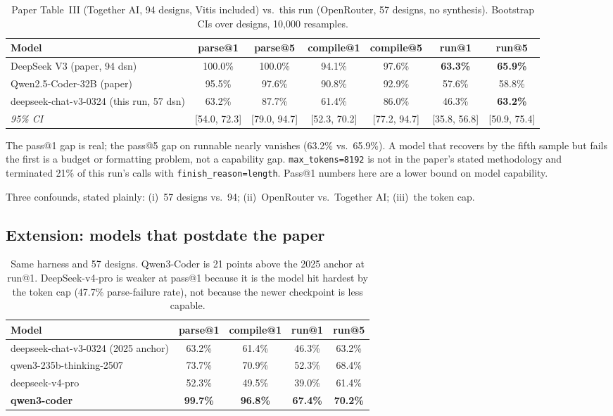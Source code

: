 \documentclass[11pt]{article}
\newcommand{\code}[1]{\texttt{#1}}
\begin{document}
\begin{table}[h]
\centering
\small
\begin{tabular}{@{}lcccccc@{}}
\toprule
\textbf{Model} & \textbf{parse@1} & \textbf{parse@5} & \textbf{compile@1} & \textbf{compile@5} & \textbf{run@1} & \textbf{run@5} \\
\midrule
DeepSeek V3 (paper, 94 dsn) & 100.0\% & 100.0\% & 94.1\% & 97.6\% & \textbf{63.3\%} & \textbf{65.9\%} \\
Qwen2.5-Coder-32B (paper) & 95.5\% & 97.6\% & 90.8\% & 92.9\% & 57.6\% & 58.8\% \\
\midrule
deepseek-chat-v3-0324 (this run, 57 dsn)
  & 63.2\% & 87.7\% & 61.4\% & 86.0\% & 46.3\% & \textbf{63.2\%} \\
\emph{95\% CI}
  & \scriptsize{[54.0, 72.3]}
  & \scriptsize{[79.0, 94.7]}
  & \scriptsize{[52.3, 70.2]}
  & \scriptsize{[77.2, 94.7]}
  & \scriptsize{[35.8, 56.8]}
  & \scriptsize{[50.9, 75.4]} \\
\bottomrule
\end{tabular}
\caption{Paper Table~III (Together AI, 94 designs, Vitis included) vs.\
this run (OpenRouter, 57 designs, no synthesis). Bootstrap CIs over
designs, 10{,}000 resamples.}
\label{tab:hls-repro}
\end{table}

The pass@1 gap is real; the pass@5 gap on runnable nearly vanishes
(63.2\% vs.\ 65.9\%). A model that recovers by the fifth sample but
fails the first is a budget or formatting problem, not a capability
gap. \code{max\_tokens=8192} is not in the paper's stated methodology
and terminated 21\% of this run's calls with
\code{finish\_reason=length}. Pass@1 numbers here are a lower
bound on model capability.

Three confounds, stated plainly: (i)~57 designs vs.\ 94; (ii)~OpenRouter
vs.\ Together AI; (iii)~the token cap.

\subsection{Extension: models that postdate the paper}

\begin{table}[h]
\centering
\begin{tabular}{@{}lcccc@{}}
\toprule
\textbf{Model} & \textbf{parse@1} & \textbf{compile@1} & \textbf{run@1} & \textbf{run@5} \\
\midrule
deepseek-chat-v3-0324 (2025 anchor) & 63.2\% & 61.4\% & 46.3\% & 63.2\% \\
qwen3-235b-thinking-2507 & 73.7\% & 70.9\% & 52.3\% & 68.4\% \\
deepseek-v4-pro & 52.3\% & 49.5\% & 39.0\% & 61.4\% \\
\textbf{qwen3-coder} & \textbf{99.7\%} & \textbf{96.8\%} & \textbf{67.4\%} & \textbf{70.2\%} \\
\bottomrule
\end{tabular}
\caption{Same harness and 57 designs. Qwen3-Coder is 21 points above the
2025 anchor at run@1. DeepSeek-v4-pro is weaker at pass@1 because it is
the model hit hardest by the token cap (47.7\% parse-failure rate), not
because the newer checkpoint is less capable.}
\label{tab:hls-ext}
\end{table}
\end{document}
